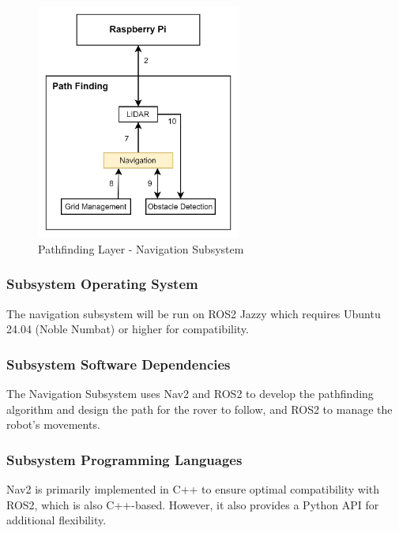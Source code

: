 \begin{figure}[h!]
	\centering
 	\includegraphics[width=0.60\textwidth]{images/pathfinding/2_navigation.jpg}
 \caption{Pathfinding Layer - Navigation Subsystem}
\end{figure}

\subsubsection{Subsystem Operating System}
The navigation subsystem will be run on ROS2 Jazzy which requires Ubuntu 24.04 (Noble Numbat) or higher for compatibility. 
\subsubsection{Subsystem Software Dependencies}
The Navigation Subsystem uses Nav2 and ROS2 to develop the pathfinding algorithm and design the path for the rover to follow, and ROS2 to manage the robot's movements.

\subsubsection{Subsystem Programming Languages}
Nav2 is primarily implemented in C++ to ensure optimal compatibility with ROS2, which is also C++-based. However, it also provides a Python API for additional flexibility.
